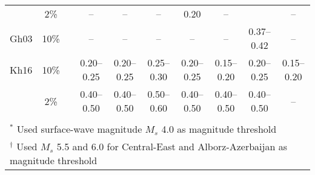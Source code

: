 \begin{table*}[t]
\begin{tabular}{lccccccccc}
            &   2\%  &&   --        &   --        &   --        &   0.20      &   --        &             &   --        \\
    Gh03    &  10\%  &&   --        &   --        &   --        &   --        &   --        & 0.37--0.42  &   --        \\
    Kh16    &  10\%  && 0.20--0.25  & 0.20--0.25  & 0.25--0.30  & 0.20--0.25  & 0.15--0.20  & 0.20--0.25  & 0.15--0.20  \\
            &   2\%  && 0.40--0.50  & 0.40--0.50  & 0.50--0.60  & 0.40--0.50  & 0.40--0.50  & 0.40--0.50  &   --        \\[0.6ex]
    \hline                                                                                                              \\[-1.6ex]
    \multicolumn{10}{l}{\small{${}^{*}$ Used surface-wave magnitude $M_s$ 4.0 as magnitude threshold}}                  \\
    \multicolumn{10}{l}{\small{${}^{\dagger}$ Used $M_s$ 5.5 and 6.0 for Central-East and Alborz-Azerbaijan as magnitude threshold}}    
\end{tabular}
\label{tab:pga} 
\end{table*}
